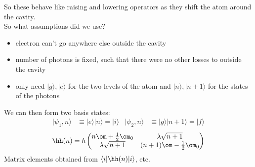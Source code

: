 \documentclass[a4paper, 11pt, normalem]{report}
\begin{document}
\begin{multicols}{2}
So these behave like raising and lowering operators as they shift the atom around the cavity.\\
So what assumptions did we use?
\begin{itemize}
    \item electron can't go anywhere else outside the cavity
    \item number of photons is fixed, such that there were no other losses to outside the cavity
    \item only need $|g\rangle,|e\rangle$ for the two levels of the atom and $|n\rangle,|n+1\rangle$ for the states of the photons
\end{itemize}
\columnbreak
\begin{figure}[H]
    \centering
\end{figure}
\end{multicols}
We can then form two basis states:
\begin{align}
    |\psi_1,n\rangle &\equiv |e\rangle|n\rangle = |i\rangle & |\psi_2,n\rangle &\equiv |g\rangle|n+1\rangle = |f\rangle
\end{align}
\begin{equation}
    \hh(n) = \hbar\begin{pmatrix} n\om+\frac12\om_0 & \lambda\sqrt{n+1} \\ \lambda\sqrt{n+1} & (n+1)\om-\frac12\om_0\end{pmatrix}
\end{equation}
Matrix elements obtained from $\langle i|\hh(n)|i\rangle$, etc.

\chapter{}
\end{document}
